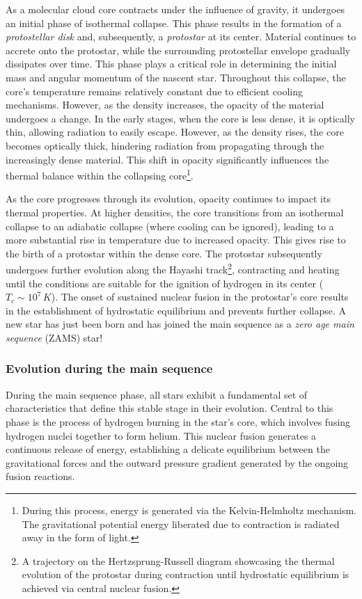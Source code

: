 \documentclass[main.tex]{subfiles}
\begin{document}
    As a molecular cloud core contracts under the influence of gravity, it undergoes an initial phase of isothermal collapse. This phase results in the formation of a \textit{protostellar disk} and, subsequently, a \textit{protostar} at its center. Material continues to accrete onto the protostar, while the surrounding protostellar envelope gradually dissipates over time. This phase plays a critical role in determining the initial mass and angular momentum of the nascent star.
    Throughout this collapse, the core's temperature remains relatively constant due to efficient cooling mechanisms. However, as the density increases, the opacity of the material undergoes a change. In the early stages, when the core is less dense, it is optically thin, allowing radiation to easily escape. However, as the density rises, the core becomes optically thick, hindering radiation from propagating through the increasingly dense material. This shift in opacity significantly influences the thermal balance within the collapsing core\footnote{During this process, energy is generated via the Kelvin-Helmholtz mechanism. The gravitational potential energy liberated due to contraction is radiated away in the form of light.}.
    
    As the core progresses through its evolution, opacity continues to impact its thermal properties. At higher densities, the core transitions from an isothermal collapse to an adiabatic collapse (where cooling can be ignored), leading to a more substantial rise in temperature due to increased opacity. This gives rise to the birth of a protostar within the dense core. The protostar subsequently undergoes further evolution along the Hayashi track\footnote{A trajectory on the Hertzsprung-Russell diagram showcasing the thermal evolution of the protostar during contraction until hydrostatic equilibrium is achieved via central nuclear fusion.}, contracting and heating until the conditions are suitable for the ignition of hydrogen in its center ($T_c \sim 10^7\,\text{}K$). The onset of sustained nuclear fusion in the protostar's core results in the establishment of hydrostatic equilibrium and prevents further collapse. A new star has just been born and has joined the main sequence as a \textit{zero age main sequence} (ZAMS) star!

    \subsubsection{Evolution during the main sequence}
    During the main sequence phase, all stars exhibit a fundamental set of characteristics that define this stable stage in their evolution. Central to this phase is the process of hydrogen burning in the star's core, which involves fusing hydrogen nuclei together to form helium. This nuclear fusion generates a continuous release of energy, establishing a delicate equilibrium between the gravitational forces 
    and the outward pressure gradient generated by the ongoing fusion reactions.
\end{document}
